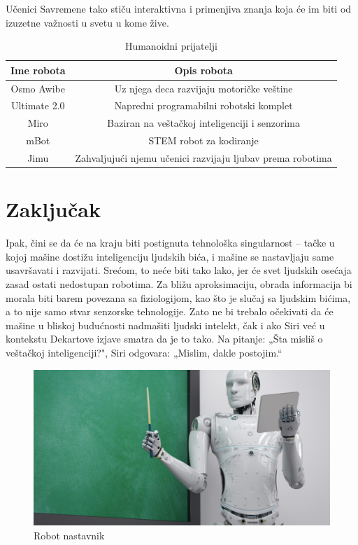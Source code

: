 \documentclass[a4paper]{article}
\begin{document}
Učenici Savremene tako stiču interaktivna i primenjiva znanja koja će im biti od izuzetne važnosti u svetu u kome žive.

\begin{table}[h!]
\begin{center}
\caption{Humanoidni prijatelji}
\begin{tabular}{|c|c|} \hline
Ime robota& Opis robota\\ \hline
Osmo Awibe &Uz njega deca razvijaju motoričke veštine\\ \hline
Ultimate 2.0 &Napredni programabilni robotski komplet\\ \hline
Miro &Baziran na veštačkoj inteligenciji i senzorima\\ \hline
mBot &STEM robot za kodiranje\\ \hline
Jimu &Zahvaljujući njemu učenici razvijaju ljubav prema robotima\\ \hline
\end{tabular}
\label{tab:tabela1}
\end{center}
\end{table}

\section{Zaključak}
Ipak, čini se da će na kraju biti postignuta tehnološka singularnost – tačke u kojoj mašine dostižu inteligenciju ljudskih bića, i mašine se nastavljaju same usavršavati i razvijati. Srećom, to neće biti tako lako, jer će svet ljudskih osećaja zasad ostati nedostupan robotima. Za bližu aproksimaciju, obrada informacija bi morala biti barem povezana sa fiziologijom, kao što je slučaj sa ljudskim bićima, a to nije samo stvar senzorske tehnologije. Zato ne bi trebalo očekivati da će mašine u bliskoj budućnosti nadmašiti ljudski intelekt, čak i ako Siri već u kontekstu Dekartove izjave smatra da je to tako. Na pitanje: „Šta misliš o veštačkoj inteligenciji?", Siri odgovara: „Mislim, dakle postojim.“

\begin{figure}[h!]
\begin{center}
\includegraphics[scale=0.4]{robot.jpg}
\end{center}
\caption{Robot nastavnik}
\label{fig:robotnastavnik}
\end{figure}
\end{document}
